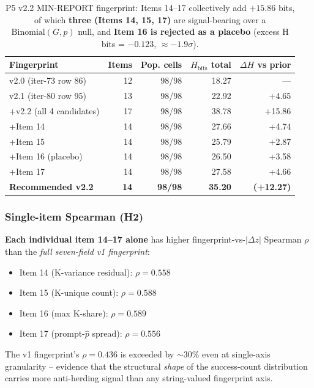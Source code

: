 \documentclass{article}  \usepackage[preprint,nonatbib]{neurips_2026} \usepackage[numbers]{natbib}
\begin{document}
\begin{table}[ht]
\centering
\small
\caption{P5 v2.2 MIN-REPORT fingerprint: Items 14--17 collectively add
$+15.86$ bits, of which \textbf{three (Items 14, 15, 17)} are signal-bearing
over a $\mathrm{Binomial}(G,p)$ null, and \textbf{Item 16 is rejected as
a placebo} (excess H bits = $-0.123$, $\approx -1.9\sigma$).}
\label{tab:p5-v22-uplift}
\begin{tabular}{l r r r r}
\toprule
Fingerprint & Items & Pop. cells & $H_{\mathrm{bits}}$ total & $\Delta H$ vs prior \\
\midrule
v2.0 (iter-73 row 86)        & 12  & 98/98 & 18.27 & --- \\
v2.1 (iter-80 row 95)        & 13  & 98/98 & 22.92 & +4.65 \\
+v2.2 (all 4 candidates)     & 17  & 98/98 & 38.78 & +15.86 \\
\quad +Item 14               & 14 & 98/98 & 27.66 & +4.74 \\
\quad +Item 15               & 14 & 98/98 & 25.79 & +2.87 \\
\quad +Item 16 (placebo)     & 14 & 98/98 & 26.50 & +3.58 \\
\quad +Item 17               & 14 & 98/98 & 27.58 & +4.66 \\
\midrule
\textbf{Recommended v2.2}    & \textbf{14} & \textbf{98/98} & \textbf{35.20} & \textbf{(+12.27)} \\
\bottomrule
\end{tabular}
\end{table}

\subsubsection{Single-item Spearman (H2)}
\textbf{Each individual item 14--17 alone} has higher fingerprint-vs-$|\Delta z|$
Spearman $\rho$ than the \emph{full seven-field v1 fingerprint}:
\begin{itemize}
  \item Item 14 (K-variance residual): $\rho = 0.558$
  \item Item 15 (K-unique count): $\rho = 0.588$
  \item Item 16 (max K-share): $\rho = 0.589$
  \item Item 17 (prompt-$\hat p$ spread): $\rho = 0.556$
\end{itemize}
The v1 fingerprint's $\rho = 0.436$ is exceeded by $\sim 30\%$ even at
single-axis granularity -- evidence that the structural \emph{shape} of
the success-count distribution carries more anti-herding signal than
any string-valued fingerprint axis.
\end{document}
